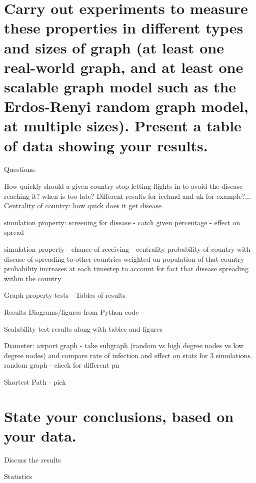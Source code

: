 \documentclass[a4paper,11pt]{article}
\begin{document}
\section{Carry out experiments to measure these properties in different types and sizes of graph (at least one real-world graph, and at least one scalable graph model such as the Erdos-Renyi random graph model, at multiple sizes). Present a table of data showing your results.}

Questions:

How quickly should a given country stop letting flights in to avoid the disease reaching it? when is too late? Different results for iceland and uk for example?...
Centrality of country: how quick does it get disease 

simulation property: screening for disease - catch given percentage -  effect on spread

simulation property - chance of receiving - centrality
probability of country with disease of spreading to other countries weighted on population of that country
probability increases at each timestep to account for fact that disease spreading within the country



Graph property tests - Tables of results

Results Diagrams/figures from Python code


Scalability  test results along with tables and figures

Diameter: airport graph - take subgraph (random vs high degree nodes vs low degree nodes) and compare rate of infection and effect on stats for 3 simulations. random graph - check for different pn

Shortest Path - pick 


\section{State your conclusions, based on your data.}

Discuss the results


Statistics

\clearpage



\end{document}
